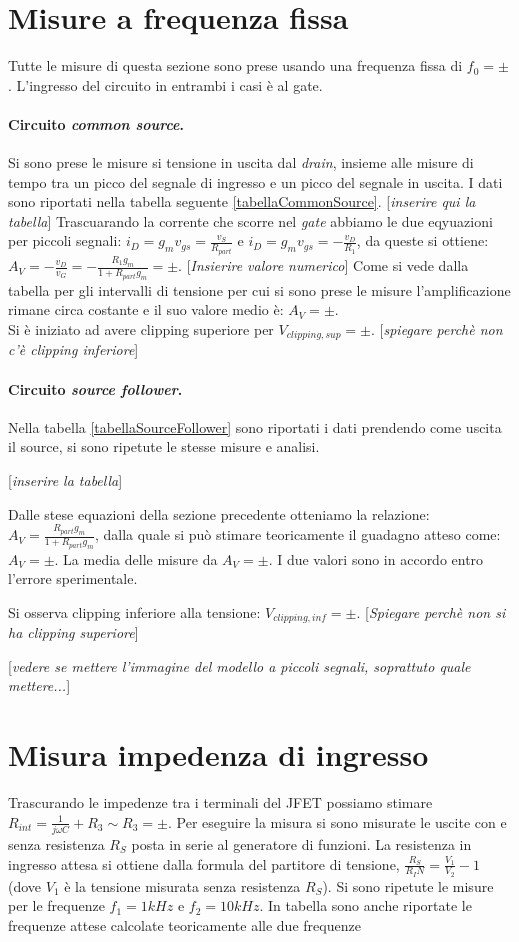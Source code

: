\documentclass[10pt,a4paper]{article}
\newcommand{\rem}[1]{[\emph{#1}]}
\begin{document}
\section{Misure a frequenza fissa}
Tutte le misure di questa sezione sono prese usando una frequenza fissa di $f_0 = \pm$. L'ingresso del circuito in entrambi i casi è al gate.
\paragraph{Circuito \emph{common source}.}
Si sono prese le misure si tensione in uscita dal \emph{drain}, insieme alle misure di tempo tra un picco del segnale di ingresso e un picco del segnale in uscita. I dati sono riportati nella tabella seguente \ref{tabellaCommonSource}.
\rem{inserire qui la tabella}
Trascuarando la corrente che scorre nel \emph{gate} abbiamo le due eqyuazioni per piccoli segnali: $i_D = g_m v_{gs} = \frac{v_S}{R_{part}}$ e $i_D = g_m v_{gs} = -\frac{v_D}{R_1}$, da queste si ottiene: $A_V = -\frac{v_D}{v_G} = - \frac{R_1 g_m}{1+R_{part} g_m} = \pm $. \rem{Insierire valore numerico}
Come si vede dalla tabella per gli intervalli di tensione per cui si sono prese le misure l'amplificazione rimane circa costante e il suo valore medio è: $A_V = \pm$. \\
Si è iniziato ad avere clipping superiore per $V_{clipping, sup} = \pm $.
\rem{spiegare perchè non c'è clipping inferiore}

\paragraph{Circuito \emph{source follower}.}
Nella tabella \ref{tabellaSourceFollower} sono riportati i dati prendendo come uscita il source, si sono ripetute le stesse misure e analisi.

\rem{inserire la tabella}

Dalle stese equazioni della sezione precedente otteniamo la relazione: $A_V = \frac{R_{part} g_m}{1+R_{part} g_m}$, dalla quale si può stimare teoricamente il guadagno atteso come: $A_V = \pm$. La media delle misure da $A_V = \pm$. I due valori sono in accordo entro l'errore sperimentale.

Si osserva clipping inferiore alla tensione: $V_{clipping, inf} = \pm $. 
\rem{Spiegare perchè non si ha clipping superiore}

\rem{vedere se mettere l'immagine del modello a piccoli segnali, soprattuto quale mettere...}
\section{Misura impedenza di ingresso}
Trascurando le impedenze tra i terminali del JFET possiamo stimare $R_{int} = \frac{1}{j \omega C} + R_3 \sim R_3 = \pm$. Per eseguire la misura si sono misurate le uscite con e senza resistenza $R_{S}$ posta in serie al generatore di funzioni. La resistenza in ingresso attesa si ottiene dalla formula del partitore di tensione, $\frac{R_S}{R_IN} = \frac {V_1}{V_2} - 1$ (dove $V_1$ è la tensione misurata senza resistenza $R_S$). Si sono ripetute le misure per le frequenze $f_1 = 1 kHz$ e $f_2 = 10 kHz$.
In tabella sono anche riportate le frequenze attese calcolate teoricamente alle due frequenze
\end{document}
